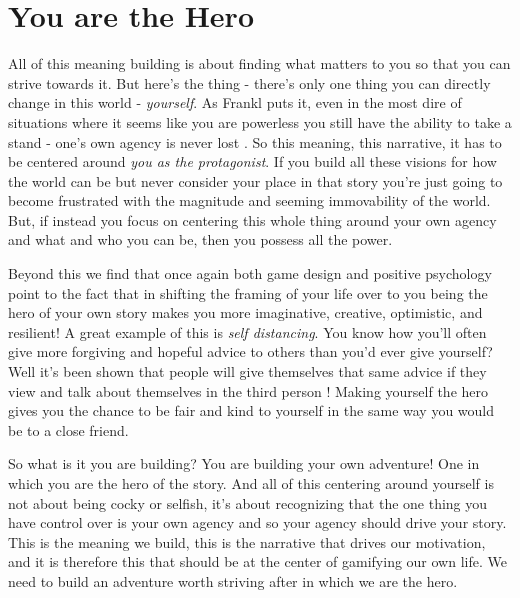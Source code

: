 \documentclass[11pt,a5paper]{book}
\begin{document}
\section{You are the Hero}
All of this meaning building is about finding what matters to you so that you can strive towards it. But here's the thing - there's only one thing you can directly change in this world - \textit{yourself}. As Frankl puts it, even in the most dire of situations where it seems like you are powerless you still have the ability to take a stand - one's own agency is never lost \cite{frankl}. So this meaning, this narrative, it has to be centered around \textit{you as the protagonist}. If you build all these visions for how the world can be but never consider your place in that story you're just going to become frustrated with the magnitude and seeming immovability of the world. But, if instead you focus on centering this whole thing around your own agency and what and who you can be, then you possess all the power. 
\newline

Beyond this we find that once again both game design \cite{superbetter} and positive psychology \cite{seligman} point to the fact that in shifting the framing of your life over to you being the hero of your own story makes you more imaginative, creative, optimistic, and resilient! A great example of this is \textit{self distancing}. You know how you'll often give more forgiving and hopeful advice to others than you'd ever give yourself? Well it's been shown that people will give themselves that same advice if they view and talk about themselves in the third person \cite{superbetter}! Making yourself the hero gives you the chance to be fair and kind to yourself in the same way you would be to a close friend.
\newline

So what is it you are building? You are building your own adventure! One in which you are the hero of the story. And all of this centering around yourself is not about being cocky or selfish, it's about recognizing that the one thing you have control over is your own agency and so your agency should drive your story. This is the meaning we build, this is the narrative that drives our motivation, and it is therefore this that should be at the center of gamifying our own life. We need to build an adventure worth striving after in which we are the hero. 
\newline
\end{document}
